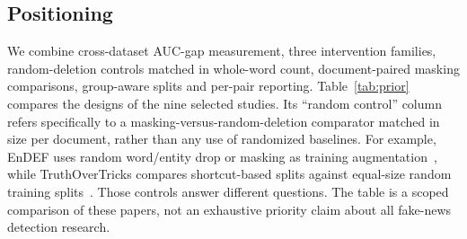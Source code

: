 \subsection{Positioning}
We combine cross-dataset AUC-gap measurement, three intervention families, random-deletion controls matched in whole-word count, document-paired masking comparisons, group-aware splits and per-pair reporting. Table~\ref{tab:prior} compares the designs of the nine selected studies. Its ``random control'' column refers specifically to a masking-versus-random-deletion comparator matched in size per document, rather than any use of randomized baselines. For example, EnDEF uses random word/entity drop or masking as training augmentation~\cite{zhu2022endef}, while TruthOverTricks compares shortcut-based splits against equal-size random training splits~\cite{wan2025truth}. Those controls answer different questions. The table is a scoped comparison of these papers, not an exhaustive priority claim about all fake-news detection research.

